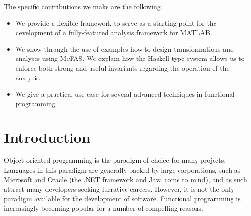 \documentclass[letterpaper,11pt]{article}
\newcommand{\mcfas}{\textsc{McFAS}}
\newcommand{\matlab}{MATLAB}
\begin{document}
The specific contributions we make are the following.

\begin{itemize}
    \item
        We provide a flexible framework to serve as a starting point for the
        development of a fully-featured analysis framework for \matlab{}.

    \item
        We show through the use of examples how to design transformations and
        analyses using \mcfas{}. We explain how the Haskell type system allows
        us to enforce both strong and useful invariants regarding the operation
        of the analysis.

    \item
        We give a practical use case for several advanced techniques in
        functional programming.
\end{itemize}

\section{Introduction} \label{sec:intro}

Object-oriented programming is the paradigm of choice for many projects.
Languages in this paradigm are generally backed by large corporations, such as
Microsoft and Oracle (the .NET framework and Java come to mind), and as such
attract many developers seeking lucrative careers. However, it is not the only
paradigm available for the development of software. Functional programming is
increasingly becoming popular for a number of compelling reasons.
\end{document}
